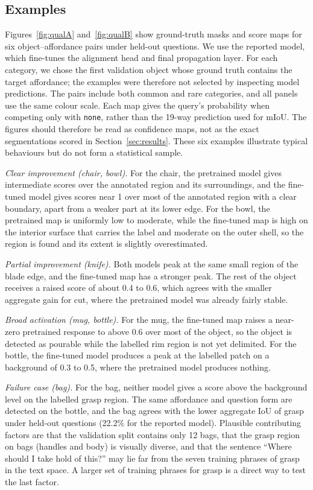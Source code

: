 \documentclass[conference]{IEEEtran}
\begin{document}
\subsection{Examples}
Figures~\ref{fig:qualA} and~\ref{fig:qualB} show ground-truth masks and score maps for six object--affordance pairs under held-out questions. We use the reported model, which fine-tunes the alignment head and final propagation layer. For each category, we chose the first validation object whose ground truth contains the target affordance; the examples were therefore not selected by inspecting model predictions. The pairs include both common and rare categories, and all panels use the same colour scale. Each map gives the query's probability when competing only with \texttt{none}, rather than the 19-way prediction used for mIoU. The figures should therefore be read as confidence maps, not as the exact segmentations scored in Section~\ref{sec:results}. These six examples illustrate typical behaviours but do not form a statistical sample.

\emph{Clear improvement (chair, bowl).} For the chair, the pretrained model gives intermediate scores over the annotated region and its surroundings, and the fine-tuned model gives scores near 1 over most of the annotated region with a clear boundary, apart from a weaker part at its lower edge. For the bowl, the pretrained map is uniformly low to moderate, while the fine-tuned map is high on the interior surface that carries the label and moderate on the outer shell, so the region is found and its extent is slightly overestimated.

\emph{Partial improvement (knife).} Both models peak at the same small region of the blade edge, and the fine-tuned map has a stronger peak. The rest of the object receives a raised score of about 0.4 to 0.6, which agrees with the smaller aggregate gain for cut, where the pretrained model was already fairly stable.

\emph{Broad activation (mug, bottle).} For the mug, the fine-tuned map raises a near-zero pretrained response to above 0.6 over most of the object, so the object is detected as pourable while the labelled rim region is not yet delimited. For the bottle, the fine-tuned model produces a peak at the labelled patch on a background of 0.3 to 0.5, where the pretrained model produces nothing.

\emph{Failure case (bag).} For the bag, neither model gives a score above the background level on the labelled grasp region. The same affordance and question form are detected on the bottle, and the bag agrees with the lower aggregate IoU of grasp under held-out questions (22.2\% for the reported model). Plausible contributing factors are that the validation split contains only 12 bags, that the grasp region on bags (handles and body) is visually diverse, and that the sentence ``Where should I take hold of this?'' may lie far from the seven training phrases of grasp in the text space. A larger set of training phrases for grasp is a direct way to test the last factor.
\end{document}
